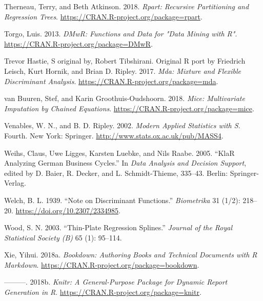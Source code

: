 \documentclass[
]{book}
\theoremstyle{plain}
\theoremstyle{definition}
\theoremstyle{definition}
\theoremstyle{definition}
\theoremstyle{definition}
\theoremstyle{remark}
\begin{document}
\leavevmode\hypertarget{ref-R-rpart}{}%
Therneau, Terry, and Beth Atkinson. 2018. \emph{Rpart: Recursive Partitioning and Regression Trees}. \url{https://CRAN.R-project.org/package=rpart}.

\leavevmode\hypertarget{ref-R-DMwR}{}%
Torgo, Luis. 2013. \emph{DMwR: Functions and Data for "Data Mining with R"}. \url{https://CRAN.R-project.org/package=DMwR}.

\leavevmode\hypertarget{ref-R-mda}{}%
Trevor Hastie, S original by, Robert Tibshirani. Original R port by Friedrich Leisch, Kurt Hornik, and Brian D. Ripley. 2017. \emph{Mda: Mixture and Flexible Discriminant Analysis}. \url{https://CRAN.R-project.org/package=mda}.

\leavevmode\hypertarget{ref-R-mice}{}%
van Buuren, Stef, and Karin Groothuis-Oudshoorn. 2018. \emph{Mice: Multivariate Imputation by Chained Equations}. \url{https://CRAN.R-project.org/package=mice}.

\leavevmode\hypertarget{ref-R-MASS}{}%
Venables, W. N., and B. D. Ripley. 2002. \emph{Modern Applied Statistics with S}. Fourth. New York: Springer. \url{http://www.stats.ox.ac.uk/pub/MASS4}.

\leavevmode\hypertarget{ref-R-klaR}{}%
Weihs, Claus, Uwe Ligges, Karsten Luebke, and Nils Raabe. 2005. ``KlaR Analyzing German Business Cycles.'' In \emph{Data Analysis and Decision Support}, edited by D. Baier, R. Decker, and L. Schmidt-Thieme, 335--43. Berlin: Springer-Verlag.

\leavevmode\hypertarget{ref-welch1939}{}%
Welch, B. L. 1939. ``Note on Discriminant Functions.'' \emph{Biometrika} 31 (1/2): 218--20. \url{https://doi.org/10.2307/2334985}.

\leavevmode\hypertarget{ref-R-mgcv}{}%
Wood, S. N. 2003. ``Thin-Plate Regression Splines.'' \emph{Journal of the Royal Statistical Society (B)} 65 (1): 95--114.

\leavevmode\hypertarget{ref-R-bookdown}{}%
Xie, Yihui. 2018a. \emph{Bookdown: Authoring Books and Technical Documents with R Markdown}. \url{https://CRAN.R-project.org/package=bookdown}.

\leavevmode\hypertarget{ref-R-knitr}{}%
---------. 2018b. \emph{Knitr: A General-Purpose Package for Dynamic Report Generation in R}. \url{https://CRAN.R-project.org/package=knitr}.
\end{document}
